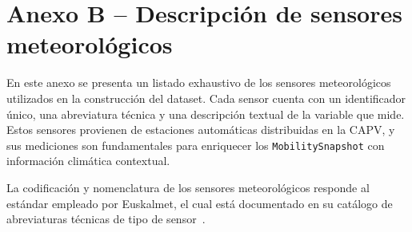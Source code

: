 \section*{Anexo B – Descripción de sensores meteorológicos}
\label{anexo:sensores}

En este anexo se presenta un listado exhaustivo de los sensores meteorológicos utilizados en la construcción del dataset. Cada sensor cuenta con un identificador único, una abreviatura técnica y una descripción textual de la variable que mide. Estos sensores provienen de estaciones automáticas distribuidas en la CAPV, y sus mediciones son fundamentales para enriquecer los \texttt{MobilitySnapshot} con información climática contextual.

La codificación y nomenclatura de los sensores meteorológicos responde al estándar empleado por Euskalmet, el cual está documentado en su catálogo de abreviaturas técnicas de tipo de sensor~\cite{sensorTypeAbbrv}.

\vspace{1em}

